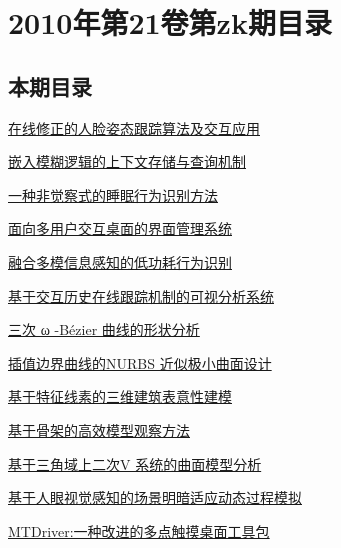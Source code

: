 \documentclass[a4paper]{article}
\begin{document}
\section{\textbf{2010年第21卷第zk期目录}}
\subsection{本期目录}
\href{http://www.jos.org.cn/ch/reader/download_pdf.aspx?file_no=10001&year_id=2010&quarter_id=zk&falg=1}{在线修正的人脸姿态跟踪算法及交互应用}

\href{http://www.jos.org.cn/ch/reader/download_pdf.aspx?file_no=10002&year_id=2010&quarter_id=zk&falg=1}{嵌入模糊逻辑的上下文存储与查询机制}

\href{http://www.jos.org.cn/ch/reader/download_pdf.aspx?file_no=10003&year_id=2010&quarter_id=zk&falg=1}{一种非觉察式的睡眠行为识别方法}

\href{http://www.jos.org.cn/ch/reader/download_pdf.aspx?file_no=10004&year_id=2010&quarter_id=zk&falg=1}{面向多用户交互桌面的界面管理系统}

\href{http://www.jos.org.cn/ch/reader/download_pdf.aspx?file_no=10005&year_id=2010&quarter_id=zk&falg=1}{融合多模信息感知的低功耗行为识别}

\href{http://www.jos.org.cn/ch/reader/download_pdf.aspx?file_no=10006&year_id=2010&quarter_id=zk&falg=1}{基于交互历史在线跟踪机制的可视分析系统}

\href{http://www.jos.org.cn/ch/reader/download_pdf.aspx?file_no=10007&year_id=2010&quarter_id=zk&falg=1}{三次 ω -Bézier 曲线的形状分析}

\href{http://www.jos.org.cn/ch/reader/download_pdf.aspx?file_no=10008&year_id=2010&quarter_id=zk&falg=1}{插值边界曲线的NURBS 近似极小曲面设计}

\href{http://www.jos.org.cn/ch/reader/download_pdf.aspx?file_no=10009&year_id=2010&quarter_id=zk&falg=1}{基于特征线素的三维建筑表意性建模}

\href{http://www.jos.org.cn/ch/reader/download_pdf.aspx?file_no=10010&year_id=2010&quarter_id=zk&falg=1}{基于骨架的高效模型观察方法}

\href{http://www.jos.org.cn/ch/reader/download_pdf.aspx?file_no=10011&year_id=2010&quarter_id=zk&falg=1}{基于三角域上二次V 系统的曲面模型分析}

\href{http://www.jos.org.cn/ch/reader/download_pdf.aspx?file_no=10012&year_id=2010&quarter_id=zk&falg=1}{基于人眼视觉感知的场景明暗适应动态过程模拟}

\href{http://www.jos.org.cn/ch/reader/download_pdf.aspx?file_no=10013&year_id=2010&quarter_id=zk&falg=1}{MTDriver:一种改进的多点触摸桌面工具包}
\end{document}
